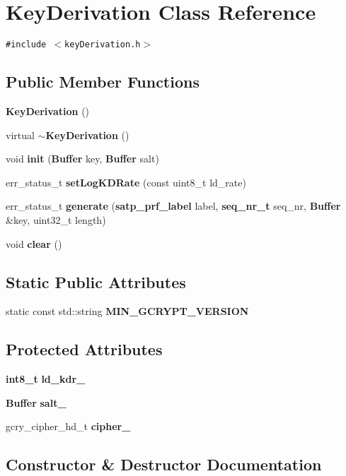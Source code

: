 \section{Key\-Derivation Class Reference}
\label{classKeyDerivation}
{\tt \#include $<$key\-Derivation.h$>$}

\subsection*{Public Member Functions}
\begin{CompactItemize}
\item 
{\bf Key\-Derivation} ()
\item 
virtual {\bf $\sim$Key\-Derivation} ()
\item 
void {\bf init} ({\bf Buffer} key, {\bf Buffer} salt)
\item 
err\_\-status\_\-t {\bf set\-Log\-KDRate} (const uint8\_\-t ld\_\-rate)
\item 
err\_\-status\_\-t {\bf generate} ({\bf satp\_\-prf\_\-label} label, {\bf seq\_\-nr\_\-t} seq\_\-nr, {\bf Buffer} \&key, uint32\_\-t length)
\item 
void {\bf clear} ()
\end{CompactItemize}
\subsection*{Static Public Attributes}
\begin{CompactItemize}
\item 
static const std::string {\bf MIN\_\-GCRYPT\_\-VERSION}
\end{CompactItemize}
\subsection*{Protected Attributes}
\begin{CompactItemize}
\item 
{\bf int8\_\-t} {\bf ld\_\-kdr\_\-}
\item 
{\bf Buffer} {\bf salt\_\-}
\item 
gcry\_\-cipher\_\-hd\_\-t {\bf cipher\_\-}
\end{CompactItemize}


\subsection{Constructor \& Destructor Documentation}
